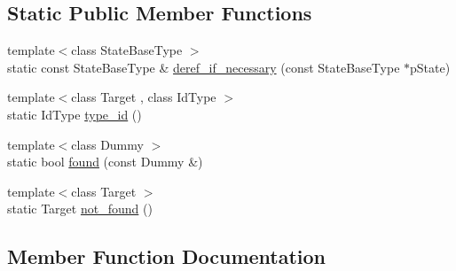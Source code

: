 \subsection*{Static Public Member Functions}
\begin{DoxyCompactItemize}
\item 
{\footnotesize template$<$class State\+Base\+Type $>$ }\\static const State\+Base\+Type \& \mbox{\hyperlink{structboost_1_1statechart_1_1detail_1_1state__cast__impl__reference__target_a2deebc71b8826ef367dcbba84fba7140}{deref\+\_\+if\+\_\+necessary}} (const State\+Base\+Type $\ast$p\+State)
\item 
{\footnotesize template$<$class Target , class Id\+Type $>$ }\\static Id\+Type \mbox{\hyperlink{structboost_1_1statechart_1_1detail_1_1state__cast__impl__reference__target_a65f19c3a6aefde938823c560f52f7a10}{type\+\_\+id}} ()
\item 
{\footnotesize template$<$class Dummy $>$ }\\static bool \mbox{\hyperlink{structboost_1_1statechart_1_1detail_1_1state__cast__impl__reference__target_a648d7c2771e20272ab97233afa8580b6}{found}} (const Dummy \&)
\item 
{\footnotesize template$<$class Target $>$ }\\static Target \mbox{\hyperlink{structboost_1_1statechart_1_1detail_1_1state__cast__impl__reference__target_a939673d38f0df4d4b1ca4c73b673ec2e}{not\+\_\+found}} ()
\end{DoxyCompactItemize}


\subsection{Member Function Documentation}
\mbox{\label{structboost_1_1statechart_1_1detail_1_1state__cast__impl__reference__target_a2deebc71b8826ef367dcbba84fba7140}} 
